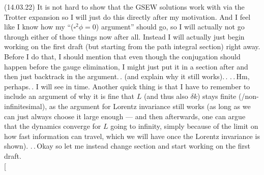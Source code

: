 \documentclass{report}
\begin{document}
(14.03.22) It is not hard to show that the GSEW solutions work with via the Trotter expansion so I will just do this directly after my motivation. And I feel like I know how my ``($\square^2\phi=0$) argument'' should go, so I will actually not go through either of those things now after all. Instead I will actually just begin working on the first draft (but starting from the path integral section) right away. Before I do that, I should mention that even though the conjugation should happen before the gauge elimination, I might just put it in a section after and then just backtrack in the argument.\,. (and explain why it still works).\,. .\,.\,Hm, perhaps.\,. I will see in time. Another quick thing is that I have to remember to include an argument of why it is fine that $L$ (and thus also $\delta k$) stays finite (/non-infinitesimal), as the argument for Lorentz invariance still works (as long as we can just always choose it large enough --- and then afterwards, one can argue that the dynamics converge for $L$ going to infinity, simply because of the limit on how fast information can travel, which we will have once the Lorentz invariance is shown). .\,.\,Okay so let me instead change section and start working on the first draft.
%
\\
\noindent*[
\end{document}
